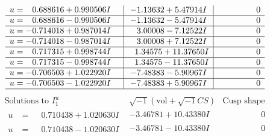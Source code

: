 \documentclass[1p]{elsarticle_modified}
\theoremstyle{definition}
\newcommand{\I}{\sqrt{-1}}
\begin{document}
$$\begin{array}{c|c|c}
\begin{aligned}
u &= \phantom{-}0.688616 + 0.990506 I\end{aligned}
 & -1.13632 + 5.47914 I & \phantom{-0.000000 } 0 \\ \hline\begin{aligned}
u &= \phantom{-}0.688616 - 0.990506 I\end{aligned}
 & -1.13632 - 5.47914 I & \phantom{-0.000000 } 0 \\ \hline\begin{aligned}
u &= -0.714018 + 0.987014 I\end{aligned}
 & \phantom{-}3.00008 - 7.12522 I & \phantom{-0.000000 } 0 \\ \hline\begin{aligned}
u &= -0.714018 - 0.987014 I\end{aligned}
 & \phantom{-}3.00008 + 7.12522 I & \phantom{-0.000000 } 0 \\ \hline\begin{aligned}
u &= \phantom{-}0.717315 + 0.998744 I\end{aligned}
 & \phantom{-}1.34575 + 11.37650 I & \phantom{-0.000000 } 0 \\ \hline\begin{aligned}
u &= \phantom{-}0.717315 - 0.998744 I\end{aligned}
 & \phantom{-}1.34575 - 11.37650 I & \phantom{-0.000000 } 0 \\ \hline\begin{aligned}
u &= -0.706503 + 1.022920 I\end{aligned}
 & -7.48383 - 5.90967 I & \phantom{-0.000000 } 0 \\ \hline\begin{aligned}
u &= -0.706503 - 1.022920 I\end{aligned}
 & -7.48383 + 5.90967 I & \phantom{-0.000000 } 0\\
 \hline 
 \end{array}$$\newpage$$\begin{array}{c|c|c}  
\text{Solutions to }I^u_{1}& \I (\text{vol} + \sqrt{-1}CS) & \text{Cusp shape}\\
 \hline 
\begin{aligned}
u &= \phantom{-}0.710438 + 1.020630 I\end{aligned}
 & -3.46781 + 10.43380 I & \phantom{-0.000000 } 0 \\ \hline\begin{aligned}
u &= \phantom{-}0.710438 - 1.020630 I\end{aligned}
 & -3.46781 - 10.43380 I & \phantom{-0.000000 } 0 \\ \hline\begin{aligned}

\end{aligned}
\end{array}$$
\end{document}
